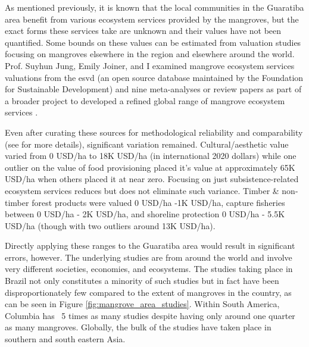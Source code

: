 As mentioned previously, it is known that the local communities in the Guaratiba area benefit from various ecosystem services provided by the mangroves, but the exact forms these services take are unknown and their values have not been quantified. Some bounds on these values can be estimated from valuation studies focusing on mangroves elsewhere in the region and elsewhere around the world. Prof. Suyhun Jung, Emily Joiner, and I examined mangrove ecosystem services valuations from the \ac{esvd} \cite{grootEcosystemServicesValuation2020} (an open source database maintained by the Foundation for Sustainable Development) and nine meta-analyses or review papers \cite{branderEmpiricsWetlandValuation2006,branderEcosystemServiceValues2012, salemEconomicValueMangroves2012, veghMangroveEcosystemServices2014, voReviewValuationMethods2012, himes-cornellMangroveEcosystemService2018, getznerEcosystemServicesMangrove2020, barbierProtectiveServiceMangrove2016, barbierEstuarineCoastalEcosystems2020} as part of a broader project to developed a refined global range of mangrove ecosystem services \cite{jungGapsMangroveForestInReview}.

Even after curating these sources for methodological reliability and comparability (see \cite{jungGapsMangroveForestInReview} for more details), significant variation remained. Cultural/aesthetic value varied from 0 USD/ha to 18K USD/ha (in international 2020 dollars) while one outlier on the value of food provisioning placed it's value at approximately 65K USD/ha when others placed it at near zero. Focusing on just subsistence-related ecosystem services reduces but does not eliminate such variance. Timber \& non-timber forest products were valued 0 USD/ha -1K USD/ha, capture fisheries between 0 USD/ha - 2K USD/ha, and shoreline protection 0 USD/ha - 5.5K USD/ha (though with two outliers around 13K USD/ha).

Directly applying these ranges to the Guaratiba area would result in significant errors, however. The underlying studies are from around the world and involve very different societies, economies, and ecosystems. The studies taking place in Brazil not only constitutes a minority of such studies but in fact have been disproportionately few compared to the extent of mangroves in the country, as can be seen in Figure \ref{fig:mangrove_area_studies}. Within South America, Columbia has ~5 times as many studies despite having only around one quarter as many mangroves. Globally, the bulk of the studies have taken place in southern and south eastern Asia. 


